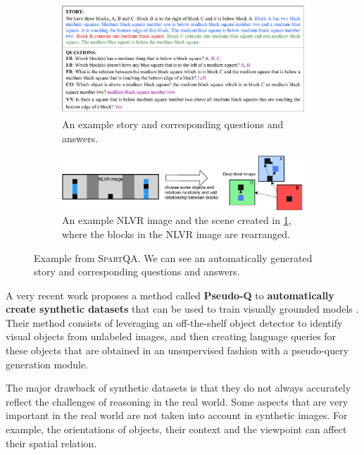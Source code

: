 \begin{figure}[ht]
	\centering
	\begin{subfigure}[b]{\linewidth}
		\includegraphics[width=\linewidth]{images/datasets/spartqa_story_sample.pdf}
		\caption{An example story and corresponding questions and answers.
		}
		\label{fig:spartqa_story_sample}
	\end{subfigure}
	\begin{subfigure}[b]{\linewidth}
			\includegraphics[width=\linewidth]{images/datasets/spartqa_nlvr.pdf}
			\caption{An example NLVR image and the scene created in \cref{fig:spartqa_story_sample}, where the blocks in the NLVR image are rearranged.
			}
			\label{fig:spartqa_nlvr}
    \end{subfigure}
 	\caption{Example from \textsc{SpartQA}. We can see an automatically generated story and corresponding questions and answers.}
	\label{fig:spartqa_examples}
\end{figure}

A very recent work proposes a method called \textbf{Pseudo-Q} to \textbf{automatically create synthetic datasets} that can be used to train visually grounded models \cite{jiang2022pseudo}. Their method consists of leveraging an off-the-shelf object detector to identify visual objects from unlabeled images, and then creating language queries for these objects that are obtained in an unsupervised fashion with a pseudo-query generation module.

The major drawback of synthetic datasets is that they do not always accurately reflect the challenges of reasoning in the real world. Some aspects that are very important in the real world are not taken into account in synthetic images. For example, the orientations of objects, their context and the viewpoint can affect their spatial relation.

